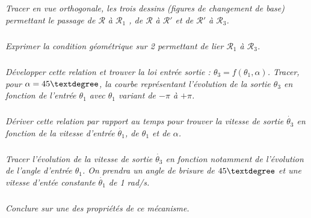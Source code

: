 \documentclass[11pt,oneside]{article}
\begin{document}
\subparagraph{}
\textit{Tracer en vue orthogonale, les trois dessins (figures de changement de base) permettant le passage de $\mathcal{R}$ à $\mathcal{R}_1$ , de $\mathcal{R}$ à $\mathcal{R}'$ et de $\mathcal{R}'$ à $\mathcal{R}_3$.}

\subparagraph{}
\textit{Exprimer la condition géométrique sur 2 permettant de lier $\mathcal{R}_1$ à $\mathcal{R}_3$.}

\subparagraph{}
\textit{Développer cette relation et trouver la loi entrée sortie : $\theta_3 = f(\theta_1 , \alpha)$. Tracer, pour $\alpha=45\textdegree$, la courbe représentant l’évolution de la sortie $\theta_3$ en fonction de l’entrée $\theta_1$ avec $\theta_1$ variant de $-\pi$ à $+\pi$.}

\subparagraph{}
\textit{Dériver cette relation par rapport au temps pour trouver la vitesse de sortie $\dot{\theta_3}$ en fonction de la vitesse d’entrée $\dot{\theta_1}$, de $\theta_1$ et de $\alpha$.}


\subparagraph{}
\textit{Tracer l’évolution de la vitesse de sortie $\dot{\theta_3}$ en fonction notamment de l’évolution de l’angle d’entrée $\theta_1$. On prendra un angle de brisure de $45\textdegree$ et une vitesse d’entée constante $\dot{\theta_1}$ de 1 rad/s.}

\subparagraph{}
\textit{Conclure sur une des propriétés de ce mécanisme.}
\end{document}
